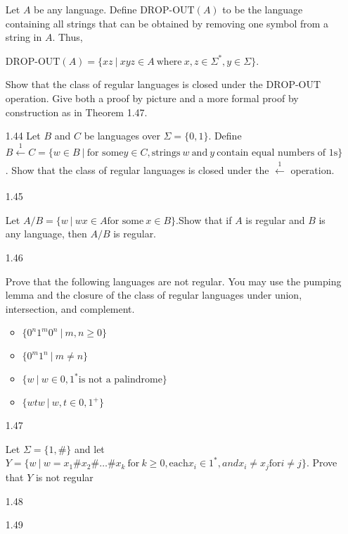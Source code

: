\begin{enumerate}
            Let $A$ be any language. Define $\text{DROP-OUT}(A)$ to be the language containing all strings that can be obtained by removing one symbol from a string in $A$. Thus,

            $\text{DROP-OUT}(A)=\{xz ~|~ xyz \in A~ \text{where}~ x,z \in \Sigma^\ast,y \in \Sigma\}$.

            Show that the class of regular languages is closed under the $\text{DROP-OUT}$ operation. Give both a proof by picture and a more formal proof by construction as in Theorem 1.47.




      \item [1.44]
      Let $B$ and $C$ be languages over $\Sigma = \{0,1\}$. Define $B \xleftarrow[]{1} C = \{w \in B~| ~\text{for some} y \in C, \text{strings}~ w~ \text{and}~ y~ \text{contain equal numbers of }1\text{s}\}$. Show that the class of regular languages is closed under the $\xleftarrow[]{1}$ operation.   

      \item [1.45]

      Let $A/B = \{w~|~wx \in A \text{for some}~ x \in B\}$.Show that if $A$ is regular and $B$ is any language, then $A/B$ is regular.
      \item [1.46]
      
      Prove that the following languages are not regular. You may use the pumping lemma and the closure of the class of regular languages under union, intersection, and complement. 

    \begin{itemize}

      \item $\{0^n1^m0^n ~|~ m,n \ge 0\}$ 

      \item $\{0^m1^n~ |~ m \ne n\} $

      \item $\{w~|~w \in {0,1}^\ast \text{is not a palindrome}\}$

      \item $\{wtw~|~w,t \in{0,1}^+\}$

    \end{itemize}
      \item [1.47]
      
      Let $\Sigma = \{1,\#\}$ and let $Y =\{w~|~w = x_1\#x_2\#\ldots \#x_k~ \text{for}~ k \ge 0, \text{each} x_i \in 1^\ast, and x_i \ne x_j \text{for} i \ne j\}$. Prove that $Y$ is not regular
      \item [1.48]
      \item [1.49]

\end{enumerate}
